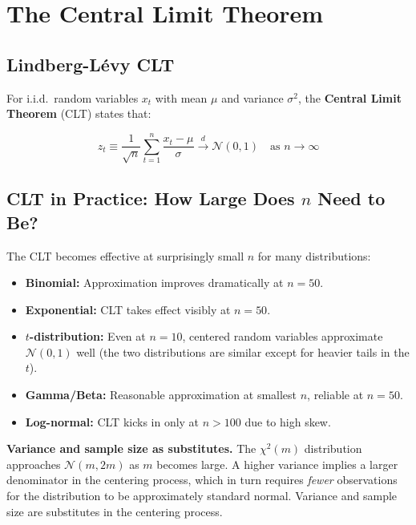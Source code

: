 \section{The Central Limit Theorem}
\label{sec_CLT}

\subsection{Lindberg-Lévy CLT}

For i.i.d.\ random variables $x_t$ with mean $\mu$ and variance $\sigma^2$,
the \textbf{Central Limit Theorem} (CLT) states
that:

\begin{tcolorbox}[keyresult]
\begin{equation}
  z_t \equiv \frac{1}{\sqrt{n}}\sum_{t=1}^{n}\frac{x_t - \mu}{\sigma}
  \xrightarrow{d} \mathcal{N}(0,1) \quad \text{as } n \to \infty
  \label{eqn_CLT}
\end{equation}
\end{tcolorbox}

\subsection{CLT in Practice: How Large Does $n$ Need to Be?}

The CLT becomes effective at surprisingly small $n$ for many distributions:

\begin{itemize}
  \item \textbf{Binomial:} Approximation improves dramatically at $n=50$.
  \item \textbf{Exponential:} CLT takes effect visibly at $n=50$.
  \item \textbf{$t$-distribution:} Even at $n=10$, centered random variables
    approximate $\mathcal{N}(0,1)$ well (the two distributions are similar
    except for heavier tails in the $t$).
  \item \textbf{Gamma/Beta:} Reasonable approximation at smallest $n$,
    reliable at $n=50$.
  \item \textbf{Log-normal:} CLT kicks in only at $n > 100$ due to high skew.
\end{itemize}

\noindent\textbf{Variance and sample size as substitutes.} The $\chi^2(m)$
distribution approaches $\mathcal{N}(m, 2m)$ as $m$ becomes large. A higher
variance implies a larger denominator in the centering process, which in turn
requires \emph{fewer} observations for the distribution to be approximately
standard normal. Variance and sample size are substitutes in the centering
process.

\renewcommand\bibname{Further reading}
\begin{subappendices}


\end{subappendices}
